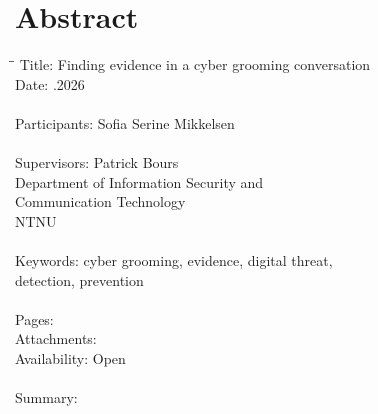 \chapter*{Abstract}

\begin{tabbing}
\hspace{2cm}\=\hspace{1.5cm}\=\kill %
Title:          \>\>Finding evidence in a cyber grooming conversation \\
Date:           \>.2026 \\ 
\\
Participants:   \>\> Sofia Serine Mikkelsen \\
\\
Supervisors:    \> \> Patrick Bours \\
                \> \> Department of Information Security and \\           
                \> \> Communication Technology\\ 
                \> \> NTNU \\
\\ 
Keywords:       \>\> cyber grooming, evidence, digital threat, \\
                \>\> detection, prevention \\
\\
Pages:          \> \\
Attachments:    \> \\
Availability:   \>\> Open \\
\\


        
Summary:
\end{tabbing}
